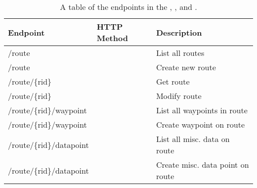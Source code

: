 \begin{table}[htpb]
    \centering
    \begin{tabu} to \textwidth {lX[c]l}
        Endpoint                 & HTTP Method        & Description   \\ \midrule
        /route                   &          & List all routes \\
        /route                   &         & Create new route \\
        /route/\{rid\}           &          & Get route \\
        /route/\{rid\}           &          & Modify route \\ \tblgrpsep
        /route/\{rid\}/waypoint  &          & List all waypoints in route \\
        /route/\{rid\}/waypoint  &         & Create waypoint on route \\ \tblgrpsep
        /route/\{rid\}/datapoint &          & List all misc. data on route \\
        /route/\{rid\}/datapoint &         & Create misc. data point on route \\
    \end{tabu}
    \caption{A table of the endpoints in the , , and .}\label{table:endpointrouteservice}
\end{table}

